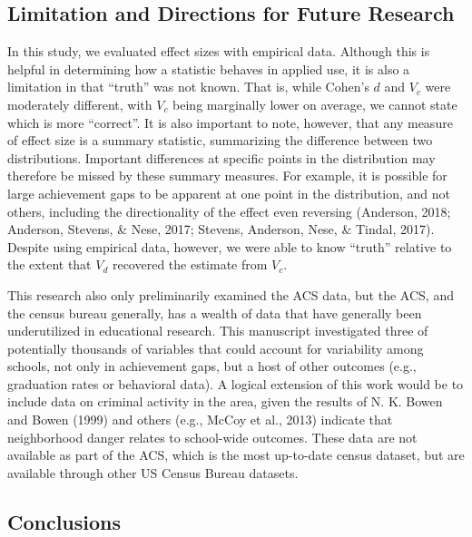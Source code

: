 \documentclass[man, fleqn, noextraspace]{apa6}
\theoremstyle{definition}
\theoremstyle{definition}
\theoremstyle{definition}
\theoremstyle{remark}
\begin{document}
\hypertarget{limitation-and-directions-for-future-research}{%
\subsection{Limitation and Directions for Future
Research}\label{limitation-and-directions-for-future-research}}

In this study, we evaluated effect sizes with empirical data. Although
this is helpful in determining how a statistic behaves in applied use,
it is also a limitation in that \enquote{truth} was not known. That is,
while Cohen's \(d\) and \(V_c\) were moderately different, with \(V_c\)
being marginally lower on average, we cannot state which is more
\enquote{correct}. It is also important to note, however, that any
measure of effect size is a summary statistic, summarizing the
difference between two distributions. Important differences at specific
points in the distribution may therefore be missed by these summary
measures. For example, it is possible for large achievement gaps to be
apparent at one point in the distribution, and not others, including the
directionality of the effect even reversing (Anderson, 2018; Anderson,
Stevens, \& Nese, 2017; Stevens, Anderson, Nese, \& Tindal, 2017).
Despite using empirical data, however, we were able to know
\enquote{truth} relative to the extent that \(V_d\) recovered the
estimate from \(V_c\).

This research also only preliminarily examined the ACS data, but the
ACS, and the census bureau generally, has a wealth of data that have
generally been underutilized in educational research. This manuscript
investigated three of potentially thousands of variables that could
account for variability among schools, not only in achievement gaps, but
a host of other outcomes (e.g., graduation rates or behavioral data). A
logical extension of this work would be to include data on criminal
activity in the area, given the results of N. K. Bowen and Bowen (1999)
and others (e.g., McCoy et al., 2013) indicate that neighborhood danger
relates to school-wide outcomes. These data are not available as part of
the ACS, which is the most up-to-date census dataset, but are available
through other US Census Bureau datasets.

\hypertarget{conclusions}{%
\subsection{Conclusions}\label{conclusions}}
\end{document}
